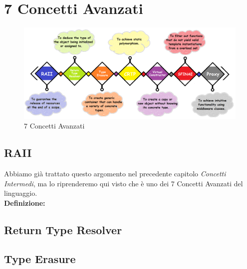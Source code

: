\newpage




\section{7 Concetti Avanzati}

\begin{figure}[H]
	\centering
	\includegraphics[width=1.2\textwidth, height=1.2\textheight, keepaspectratio]{./imgs/7-Advanced-C-programming-styles-and-idiom-examples-you-should-know.png}
	\caption{7 Concetti Avanzati}
	\label{fig:7-Advanced-C-programming-styles-and-idiom-examples-you-should-know}
\end{figure}

\subsection{RAII}

\textsf{\small Abbiamo già trattato questo argomento nel precedente capitolo \emph{Concetti Intermedi}, ma lo riprenderemo qui visto che è uno dei 7 Concetti Avanzati del linguaggio.} \\

\textsf{\small \textbf{Definizione: } } \\

\subsection{Return Type Resolver}

\subsection{Type Erasure}

